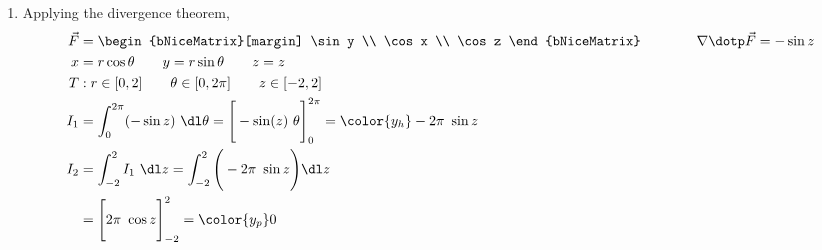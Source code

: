 \begin{enumerate}
     \item Applying the divergence theorem,
           \begin{align}
                \vec{F} & = \begin{bNiceMatrix}[margin]
                                 \sin y \\ \cos x \\ \cos z
                            \end{bNiceMatrix} \qquad\qquad
                \nabla \dotp \vec{F} = -\sin z                       \\
                x       & = r\cos \theta \qquad y = r\sin \theta
                \qquad z = z                                         \\
                T       & : r \in [0, 2] \qquad \theta \in [0, 2\pi]
                \qquad z \in [-2, 2]                                 \\
                I_1     & = \int_{0}^{2\pi} (-\sin z) \ \dl \theta
                = \Bigg[ -\sin(z)\ \theta \Bigg]_{0}^{2\pi}
                = {\color{y_h} -2\pi\ \sin z}                        \\
                I_2     & = \int_{-2}^{2} I_1 \ \dl z
                = \int_{-2}^{2} \Bigg( -2\pi\ \sin z \Bigg) \dl z    \\
                        & = \Bigg[ 2\pi\ \cos z \Bigg]_{-2}^{2}
                = {\color{y_p} 0 }                                   \\
           \end{align}


\end{enumerate}

